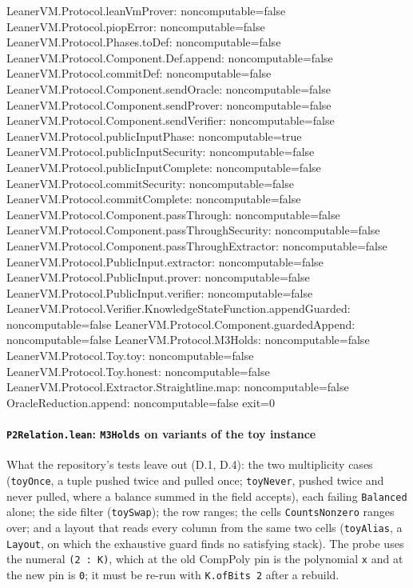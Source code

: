 \begin{srccode}
LeanerVM.Protocol.leanVmProver: noncomputable=false
LeanerVM.Protocol.piopError: noncomputable=false
LeanerVM.Protocol.Phases.toDef: noncomputable=false
LeanerVM.Protocol.Component.Def.append: noncomputable=false
LeanerVM.Protocol.commitDef: noncomputable=false
LeanerVM.Protocol.Component.sendOracle: noncomputable=false
LeanerVM.Protocol.Component.sendProver: noncomputable=false
LeanerVM.Protocol.Component.sendVerifier: noncomputable=false
LeanerVM.Protocol.publicInputPhase: noncomputable=true
LeanerVM.Protocol.publicInputSecurity: noncomputable=false
LeanerVM.Protocol.publicInputComplete: noncomputable=false
LeanerVM.Protocol.commitSecurity: noncomputable=false
LeanerVM.Protocol.commitComplete: noncomputable=false
LeanerVM.Protocol.Component.passThrough: noncomputable=false
LeanerVM.Protocol.Component.passThroughSecurity: noncomputable=false
LeanerVM.Protocol.Component.passThroughExtractor: noncomputable=false
LeanerVM.Protocol.PublicInput.extractor: noncomputable=false
LeanerVM.Protocol.PublicInput.prover: noncomputable=false
LeanerVM.Protocol.PublicInput.verifier: noncomputable=false
LeanerVM.Protocol.Verifier.KnowledgeStateFunction.appendGuarded: noncomputable=false
LeanerVM.Protocol.Component.guardedAppend: noncomputable=false
LeanerVM.Protocol.M3Holds: noncomputable=false
LeanerVM.Protocol.Toy.toy: noncomputable=false
LeanerVM.Protocol.Toy.honest: noncomputable=false
LeanerVM.Protocol.Extractor.Straightline.map: noncomputable=false
OracleReduction.append: noncomputable=false
exit=0
\end{srccode}

\paragraph{\texttt{P2Relation.lean}: \texttt{M3Holds} on variants of the toy instance}\label{sec:gen-probe-spine-P2Relation}

What the repository's tests leave out (D.1, D.4): the two multiplicity cases (\texttt{toyOnce}, a tuple pushed twice and pulled once; \texttt{toyNever}, pushed twice and never pulled, where a balance summed in the field accepts), each failing \texttt{Balanced} alone; the side filter (\texttt{toySwap}); the row ranges; the cells \texttt{CountsNonzero} ranges over; and a layout that reads every column from the same two cells (\texttt{toyAlias}, a \texttt{Layout}, on which the exhaustive guard finds no satisfying stack). The probe uses the numeral \texttt{(\allowbreak{}2 : K)}, which at the old CompPoly pin is the polynomial \texttt{x} and at the new pin is \texttt{0}; it must be re-run with \texttt{K.\allowbreak{}ofBits 2} after a rebuild.

